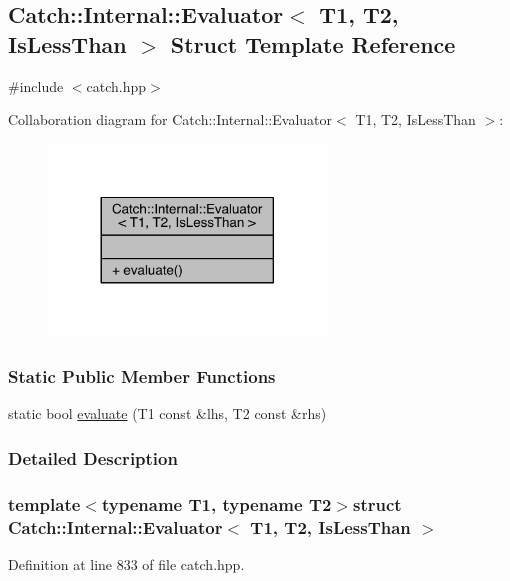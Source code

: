 \hypertarget{a00022}{}\subsection{Catch\+:\+:Internal\+:\+:Evaluator$<$ T1, T2, Is\+Less\+Than $>$ Struct Template Reference}
\label{a00022}


{\ttfamily \#include $<$catch.\+hpp$>$}



Collaboration diagram for Catch\+:\+:Internal\+:\+:Evaluator$<$ T1, T2, Is\+Less\+Than $>$\+:\nopagebreak
\begin{figure}[H]
\begin{center}
\leavevmode
\includegraphics[width=209pt]{a00316}
\end{center}
\end{figure}
\subsubsection*{Static Public Member Functions}
\begin{DoxyCompactItemize}
\item 
static bool \hyperlink{a00022_a75b2bcf80ce6f90218c145e2c3293d75}{evaluate} (T1 const \&lhs, T2 const \&rhs)
\end{DoxyCompactItemize}


\subsubsection{Detailed Description}
\subsubsection*{template$<$typename T1, typename T2$>$struct Catch\+::\+Internal\+::\+Evaluator$<$ T1, T2, Is\+Less\+Than $>$}



Definition at line 833 of file catch.\+hpp.



